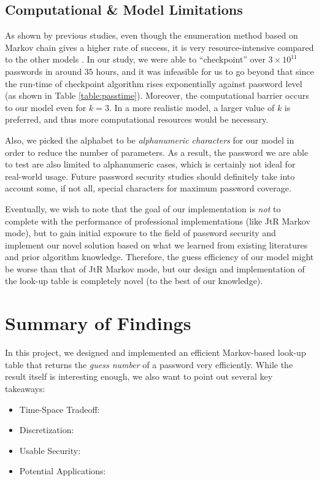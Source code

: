 \documentclass{article} %
\theoremstyle{definition}
\theoremstyle{theorem}
\theoremstyle{remark}
\theoremstyle{remark}
\begin{document}
\subsection{Computational \& Model Limitations}   \label{sect:limitation}
\par\quad As shown by previous studies, even though the enumeration method based on Markov chain gives a higher rate of success, it is very resource-intensive compared to the other models \cite{guessability}. In our study, we were able to ``checkpoint'' over $3\times 10^{11}$ passwords in around $35$ hours, and it was infeasible for us to go beyond that since the run-time of checkpoint algorithm rises exponentially against password level (as shown in Table \ref{table:passtime}). Moreover, the computational barrier occurs to our model even for $k=3$. In a more realistic model, a larger value of $k$ is preferred, and thus more computational resources would be necessary.

\par\quad Also, we picked the alphabet to be \emph{alphanumeric characters} for our model in order to reduce the number of parameters. As a result, the password we are able to test are also limited to alphanumeric cases, which is certainly not ideal for real-world usage. Future password security studies should definitely take into account some, if not all, special characters for maximum password coverage. 

\par\quad Eventually, we wish to note that the goal of our implementation is \emph{not} to complete with the performance of professional implementations (like JtR Markov mode), but to gain initial exposure to the field of password security and implement our novel solution based on what we learned from existing literatures and prior algorithm knowledge. Therefore, the guess efficiency of our model might be worse than that of JtR Markov mode, but our design and implementation of the look-up table is completely novel (to the best of our knowledge).
\section{Summary of Findings}
\par\quad In this project, we designed and implemented an efficient Markov-based look-up table that returns the \emph{guess number} of a password very efficiently. While the result itself is interesting enough, we also want to point out several key takeaways:
\begin{itemize}
    \item Time-Space Tradeoff: 
    \item Discretization:
    \item Usable Security:
    \item Potential Applications:
\end{itemize}
\end{document}
